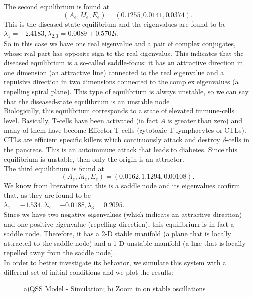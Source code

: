 The second equilibrium is found at 
$$
(A_{e},M_{e},E_{e})= (0.1255,0.0141,0.0374).
$$
This is the diseased-state equilibrium and the eigenvalues are found to be\\
$\lambda_{1}=-2.4183, \lambda_{2,3}=0.0089 \pm 0.5702i$.\\
So in this case we have one real eigenvalue and a pair of complex conjugates, whose real part has opposite sign to the real eigenvalue. This indicates that the diseased equilibrium is a so-called saddle-focus: it has an attractive direction in one dimension (an attractive line) connected to the real eigenvalue and a repulsive direction in two dimensions connected to the complex eigenvalues (a repelling spiral plane). This type of equilibrium is always unstable, so we can say that the diseased-state equilibrium is an unstable node.\\
Biologically, this equilibrium corresponds to a state of elevated immune-cells level. Basically, T-cells have been activated (in fact $A$ is greater than zero) and many of them have become Effector T-cells (cytotoxic T-lymphocytes or CTLs). CTLs are efficient specific killers which continuously attack and destroy $\beta$-cells in the pancreas. This is an autoimmune attack that leads to diabetes. Since this equilibrium is unstable, then only the origin is an attractor.\\

The third equilibrium is found at
$$
(A_{e},M_{e},E_{e})= (0.0162,1.1294,0.00108).
$$
We know from literature that this is a saddle node and its eigenvalues confirm that, as they are found to be\\
$\lambda_{1}=-1.534, \lambda_{2}=-0.0188, \lambda_{3}=0.2095$.\\
Since we have two negative eigenvalues (which indicate an attractive direction) and one positive eigenvalue (repelling direction), this equilibrium is in fact a saddle node. Therefore, it has a 2-D stable manifold (a plane that is locally attracted to the saddle node) and a 1-D unstable manifold (a line that is locally repelled away from the saddle node).\\
In order to better investigate its behavior, we simulate this system with a different set of initial conditions and we plot the results:

\begin{figure}[H]
	\caption{a)QSS Model - Simulation; b) Zoom in on stable oscillations}
\end{figure}

